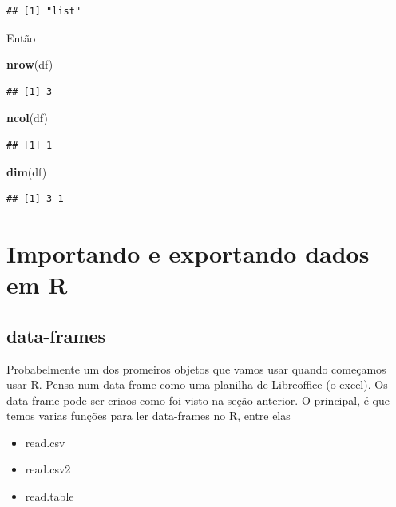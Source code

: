 \documentclass[]{book}
\newenvironment{Shaded}{\begin{snugshade}}{\end{snugshade}}
\newcommand{\KeywordTok}[1]{\textcolor[rgb]{0.13,0.29,0.53}{\textbf{#1}}}
\newcommand{\NormalTok}[1]{#1}
\providecommand{\tightlist}{%
  \setlength{\itemsep}{0pt}\setlength{\parskip}{0pt}}
\begin{document}
\begin{verbatim}
## [1] "list"
\end{verbatim}

Então

\begin{Shaded}
\begin{Highlighting}[]
\KeywordTok{nrow}\NormalTok{(df)}
\end{Highlighting}
\end{Shaded}

\begin{verbatim}
## [1] 3
\end{verbatim}

\begin{Shaded}
\begin{Highlighting}[]
\KeywordTok{ncol}\NormalTok{(df)}
\end{Highlighting}
\end{Shaded}

\begin{verbatim}
## [1] 1
\end{verbatim}

\begin{Shaded}
\begin{Highlighting}[]
\KeywordTok{dim}\NormalTok{(df)}
\end{Highlighting}
\end{Shaded}

\begin{verbatim}
## [1] 3 1
\end{verbatim}

\chapter{Importando e exportando dados em
R}\label{importando-e-exportando-dados-em-r}

\section{data-frames}\label{data-frames}

Probabelmente um dos promeiros objetos que vamos usar quando começamos
usar R. Pensa num data-frame como uma planilha de Libreoffice (o excel).
Os data-frame pode ser criaos como foi visto na seção anterior. O
principal, é que temos varias funções para ler data-frames no R, entre
elas

\begin{itemize}
\tightlist
\item
  read.csv
\item
  read.csv2
\item
  read.table
\end{itemize}
\end{document}
